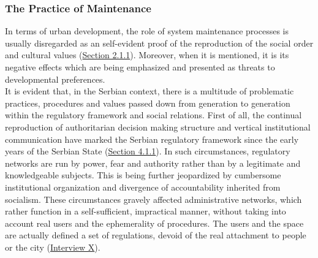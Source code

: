\documentclass[11pt]{report}
\begin{document}
{\subsubsection{The Practice of Maintenance}

In terms of urban development, the role of system maintenance processes is usually disregarded as an self-evident proof of the reproduction of the social order and cultural values (\href{Section 2.1.1}{Section 2.1.1}). 
Moreover, when it is mentioned, it is its negative effects which are being emphasized and presented as threats to developmental preferences.
\\

It is evident that, in the Serbian context, there is a multitude of problematic practices, procedures and values passed down from generation to generation within the regulatory framework and social relations. 
First of all, the continual reproduction of authoritarian decision making structure and vertical institutional communication have marked the Serbian regulatory framework since the early years of the Serbian State (\href{Section 4.1.1}{Section 4.1.1}). 
In such circumstances, regulatory networks are run by power, fear and authority rather than by a legitimate and knowledgeable subjects.
This is being further jeopardized by cumbersome institutional organization and divergence of accountability inherited from socialism.
These circumstances gravely affected administrative networks, which rather function in a self-sufficient, impractical manner, without taking into account real users and the ephemerality of procedures.
The users and the space are actually defined a set of regulations, devoid of the real attachment to people or the city (\href{InterviewX}{Interview X}).
\\

}
\end{document}
